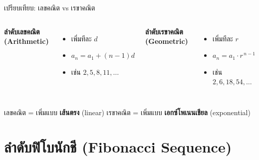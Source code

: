 \documentclass[11pt, aspectratio=169]{beamer}
\begin{document}




\begin{frame}{เปรียบเทียบ: เลขคณิต vs เรขาคณิต}
  \begin{columns}[T]
      \textbf{ลำดับเลขคณิต (Arithmetic)}
      \begin{itemize}
        \item {} เพิ่มทีละ $d$
        \item $a_n = a_1 + (n-1)d$
        \item เช่น $2, 5, 8, 11, \ldots$
      \end{itemize}

      \textbf{ลำดับเรขาคณิต (Geometric)}
      \begin{itemize}
        \item {} เพิ่มทีละ $r$
        \item $a_n = a_1 \cdot r^{\,n-1}$
        \item เช่น $2, 6, 18, 54, \ldots$
      \end{itemize}
  \end{columns}

  \begin{intuition}
    เลขคณิต = เพิ่มแบบ \textbf{เส้นตรง} (linear) \quad
    เรขาคณิต = เพิ่มแบบ \textbf{เอกซ์โพเนนเชียล} (exponential)
  \end{intuition}
\end{frame}

\section{ลำดับฟิโบนักชี (Fibonacci Sequence)}
\end{document}

